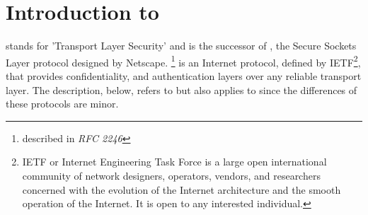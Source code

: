 \chapter{Introduction to \tls{}}

\label{sec:tlsintro}
\tls{} stands for 'Transport Layer Security' and is the successor of \ssl{}, 
the Secure Sockets Layer protocol designed by Netscape. 
\tlsI{}\footnote{described in {\it RFC 2246}} is an Internet protocol,
defined by {IETF}\footnote{IETF or Internet Engineering Task Force 
is a large open international community of network
designers, operators, vendors, and researchers concerned with the evolution of 
the Internet architecture and the smooth operation of the Internet. It is open 
to any interested individual.}, 
that provides confidentiality, and authentication layers over any reliable
transport layer. The description, below, refers to \tlsI{} but also
applies to \sslIII{} since the differences of these protocols are minor.












